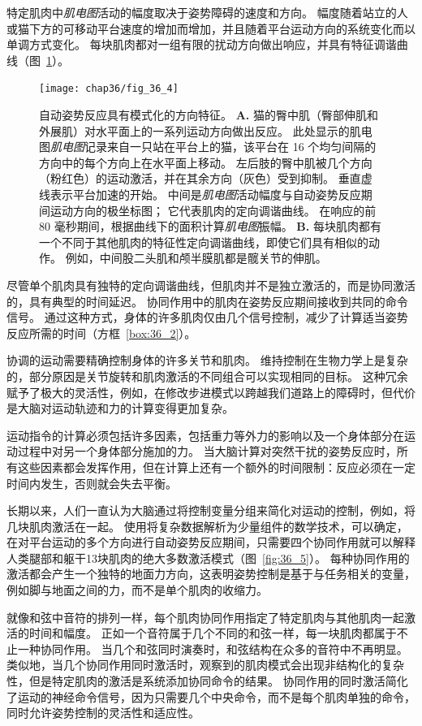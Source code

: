 特定肌肉中\textit{肌电图}活动的幅度取决于姿势障碍的速度和方向。
幅度随着站立的人或猫下方的可移动平台速度的增加而增加，并且随着平台运动方向的系统变化而以单调方式变化。
每块肌肉都对一组有限的扰动方向做出响应，并具有特征调谐曲线（图~\ref{fig:36_4}）。



\begin{figure}[htbp]
	\centering
	\texttt{[image: chap36/fig\_36\_4]}
	\caption{自动姿势反应具有模式化的方向特征\cite{macpherson1988strategies}。
		\textbf{A.} 猫的臀中肌（臀部伸肌和外展肌）对水平面上的一系列运动方向做出反应。
		此处显示的肌电图\textit{肌电图}记录来自一只站在平台上的猫，该平台在 16 个均匀间隔的方向中的每个方向上在水平面上移动。 
		左后肢的臀中肌被几个方向（粉红色）的运动激活，并在其余方向（灰色）受到抑制。 
		垂直虚线表示平台加速的开始。 
		中间是\textit{肌电图}活动幅度与自动姿势反应期间运动方向的极坐标图；
		它代表肌肉的定向调谐曲线。
		在响应的前 80 毫秒期间，根据曲线下的面积计算\textit{肌电图}振幅。 
		\textbf{B.} 每块肌肉都有一个不同于其他肌肉的特征性定向调谐曲线，即使它们具有相似的动作。
		例如，中间股二头肌和颅半膜肌都是髋关节的伸肌。}
	\label{fig:36_4}
\end{figure}


尽管单个肌肉具有独特的定向调谐曲线，但肌肉并不是独立激活的，而是协同激活的，具有典型的时间延迟。
协同作用中的肌肉在姿势反应期间接收到共同的命令信号。
通过这种方式，身体的许多肌肉仅由几个信号控制，减少了计算适当姿势反应所需的时间（方框~\ref{box:36_2}）。


\begin{proposition}[肌肉的协同激活] \label{box:36_2}
	
	\quad \quad 协调的运动需要精确控制身体的许多关节和肌肉。
	维持控制在生物力学上是复杂的，部分原因是关节旋转和肌肉激活的不同组合可以实现相同的目标。
	这种冗余赋予了极大的灵活性，例如，在修改步进模式以跨越我们道路上的障碍时，但代价是大脑对运动轨迹和力的计算变得更加复杂。
	
	\quad \quad 运动指令的计算必须包括许多因素，包括重力等外力的影响以及一个身体部分在运动过程中对另一个身体部分施加的力。
	当大脑计算对突然干扰的姿势反应时，所有这些因素都会发挥作用，但在计算上还有一个额外的时间限制：反应必须在一定时间内发生，否则就会失去平衡。
	
	\quad \quad 长期以来，人们一直认为大脑通过将控制变量分组来简化对运动的控制，例如，将几块肌肉激活在一起。
	使用将复杂数据解析为少量组件的数学技术，可以确定，在对平台运动的多个方向进行自动姿势反应期间，只需要四个协同作用就可以解释人类腿部和躯干13块肌肉的绝大多数激活模式（图~\ref{fig:36_5}）。
	每种协同作用的激活都会产生一个独特的地面力方向，这表明姿势控制是基于与任务相关的变量，例如脚与地面之间的力，而不是单个肌肉的收缩力。
	
	\quad \quad 就像和弦中音符的排列一样，每个肌肉协同作用指定了特定肌肉与其他肌肉一起激活的时间和幅度。
	正如一个音符属于几个不同的和弦一样，每一块肌肉都属于不止一种协同作用。
	当几个和弦同时演奏时，和弦结构在众多的音符中不再明显。
	类似地，当几个协同作用同时激活时，观察到的肌肉模式会出现非结构化的复杂性，但是特定肌肉的激活是系统添加协同命令的结果。
	协同作用的同时激活简化了运动的神经命令信号，因为只需要几个中央命令，而不是每个肌肉单独的命令，同时允许姿势控制的灵活性和适应性。
	
\end{proposition}


